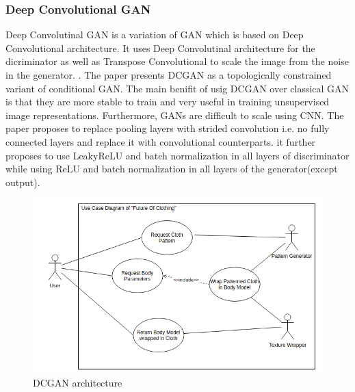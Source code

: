\documentclass{article}
\begin{document}
\subsubsection{Deep Convolutional GAN}
Deep Convolutinal GAN is a variation of GAN which is based on Deep Convolutional architecture. It uses Deep Convolutinal architecture for the dicriminator as well as Transpose Convolutional to scale the image from the noise in the generator. \cite{radford2015unsupervised}. The paper presents DCGAN as a topologically constrained variant of conditional GAN. The main benifit of usig DCGAN over classical GAN is that they are more stable to train and very useful in training unsupervised image representations. Furthermore, GANs are difficult to scale using CNN. The paper proposes to replace pooling layers with strided convolution i.e. no fully connected layers and replace it with convolutional counterparts. it further proposes to use LeakyReLU and batch normalization in all layers of discriminator while using ReLU and batch normalization in all layers of the generator(except output).
\begin{figure}[h]
    \includegraphics[scale=0.5]{images/softwareDiagrams/FinalSystemUseCase.png}
    \centering
    \caption{DCGAN architecture}    
\end{figure}
\end{document}
